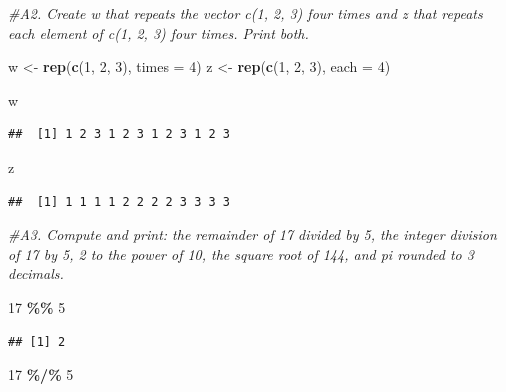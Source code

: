 \documentclass[
]{article}
\newenvironment{Shaded}{\begin{snugshade}}{\end{snugshade}}
\newcommand{\AttributeTok}[1]{\textcolor[rgb]{0.13,0.29,0.53}{#1}}
\newcommand{\CommentTok}[1]{\textcolor[rgb]{0.56,0.35,0.01}{\textit{#1}}}
\newcommand{\DecValTok}[1]{\textcolor[rgb]{0.00,0.00,0.81}{#1}}
\newcommand{\FunctionTok}[1]{\textcolor[rgb]{0.13,0.29,0.53}{\textbf{#1}}}
\newcommand{\NormalTok}[1]{#1}
\newcommand{\OtherTok}[1]{\textcolor[rgb]{0.56,0.35,0.01}{#1}}
\newcommand{\SpecialCharTok}[1]{\textcolor[rgb]{0.81,0.36,0.00}{\textbf{#1}}}
\begin{document}
\begin{Shaded}
\begin{Highlighting}[]
\CommentTok{\#A2. Create w that repeats the vector c(1, 2, 3) four times and z that repeats each element of c(1, 2, 3) four times. Print both.}

\NormalTok{w }\OtherTok{\textless{}{-}} \FunctionTok{rep}\NormalTok{(}\FunctionTok{c}\NormalTok{(}\DecValTok{1}\NormalTok{, }\DecValTok{2}\NormalTok{, }\DecValTok{3}\NormalTok{), }\AttributeTok{times =} \DecValTok{4}\NormalTok{)}
\NormalTok{z }\OtherTok{\textless{}{-}} \FunctionTok{rep}\NormalTok{(}\FunctionTok{c}\NormalTok{(}\DecValTok{1}\NormalTok{, }\DecValTok{2}\NormalTok{, }\DecValTok{3}\NormalTok{), }\AttributeTok{each =} \DecValTok{4}\NormalTok{)}

\NormalTok{w}
\end{Highlighting}
\end{Shaded}

\begin{verbatim}
##  [1] 1 2 3 1 2 3 1 2 3 1 2 3
\end{verbatim}

\begin{Shaded}
\begin{Highlighting}[]
\NormalTok{z}
\end{Highlighting}
\end{Shaded}

\begin{verbatim}
##  [1] 1 1 1 1 2 2 2 2 3 3 3 3
\end{verbatim}

\begin{Shaded}
\begin{Highlighting}[]
\CommentTok{\#A3. Compute and print: the remainder of 17 divided by 5, the integer division of 17 by 5, 2 to the power of 10, the square root of 144, and pi rounded to 3 decimals.}

\DecValTok{17} \SpecialCharTok{\%\%} \DecValTok{5}
\end{Highlighting}
\end{Shaded}

\begin{verbatim}
## [1] 2
\end{verbatim}

\begin{Shaded}
\begin{Highlighting}[]
\DecValTok{17} \SpecialCharTok{\%/\%} \DecValTok{5}
\end{Highlighting}
\end{Shaded}
\end{document}
